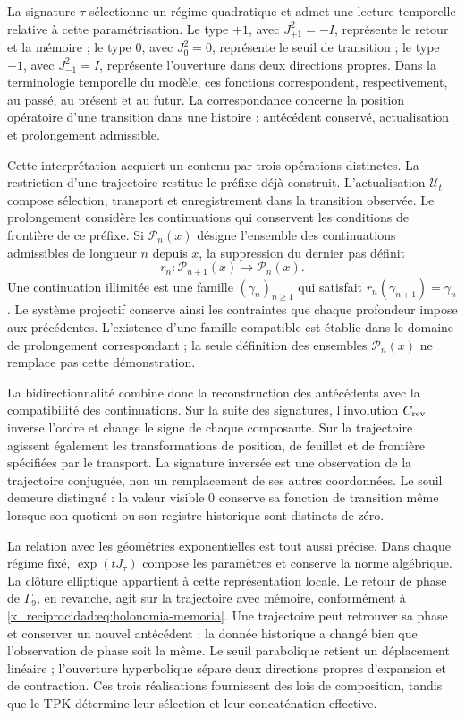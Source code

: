 La signature \(\tau\) sélectionne un régime quadratique et admet une lecture
temporelle relative à cette paramétrisation. Le type \(+1\), avec
\(J_{+1}^{2}=-I\), représente le retour et la mémoire ; le type \(0\), avec
\(J_0^{2}=0\), représente le seuil de transition ; le type \(-1\), avec
\(J_{-1}^{2}=I\), représente l’ouverture dans deux directions propres. Dans la
terminologie temporelle du modèle, ces fonctions correspondent,
respectivement, au passé, au présent et au futur. La correspondance concerne
la position opératoire d’une transition dans une histoire :
antécédent conservé, actualisation et prolongement admissible.

Cette interprétation acquiert un contenu par trois opérations distinctes.
La restriction d’une trajectoire restitue le préfixe déjà construit.
L’actualisation \(\mathcal U_t\) compose sélection, transport et enregistrement dans
la transition observée. Le prolongement considère les continuations qui
conservent les conditions de frontière de ce préfixe. Si
\(\mathcal P_n(x)\) désigne l’ensemble des continuations admissibles de
longueur \(n\) depuis \(x\), la suppression du dernier pas définit
\[
 r_n:\mathcal P_{n+1}(x)\longrightarrow\mathcal P_n(x).
\]
Une continuation illimitée est une famille \((\gamma_n)_{n\geq1}\) qui
satisfait \(r_n(\gamma_{n+1})=\gamma_n\). Le système projectif conserve ainsi
les contraintes que chaque profondeur impose aux
précédentes. L’existence d’une famille compatible est établie dans le
domaine de prolongement correspondant ; la seule définition des
ensembles \(\mathcal P_n(x)\) ne remplace pas cette démonstration.

La bidirectionnalité combine donc la reconstruction des antécédents
avec la compatibilité des continuations. Sur la suite des signatures,
l’involution \(C_{\rm rev}\) inverse l’ordre et change le signe de chaque
composante. Sur la trajectoire agissent également les transformations de
position, de feuillet et de frontière spécifiées par le transport. La signature
inversée est une observation de la trajectoire conjuguée, non un remplacement
de ses autres coordonnées. Le seuil demeure distingué : la valeur
visible \(0\) conserve sa fonction de transition même lorsque son quotient
ou son registre historique sont distincts de zéro.

La relation avec les géométries exponentielles est tout aussi précise. Dans
chaque régime fixé, \(\exp(tJ_\tau)\) compose les paramètres et conserve la
norme algébrique. La clôture elliptique appartient à cette représentation locale.
Le retour de phase de \(\Gamma_9\), en revanche, agit sur la trajectoire
avec mémoire, conformément à \eqref{x_reciprocidad:eq:holonomia-memoria}. Une trajectoire peut
retrouver sa phase et conserver un nouvel antécédent : la donnée historique a
changé bien que l’observation de phase soit la même. Le seuil parabolique
retient un déplacement linéaire ; l’ouverture hyperbolique sépare deux
directions propres d’expansion et de contraction. Ces trois réalisations
fournissent des lois de composition, tandis que le TPK détermine leur
sélection et leur concaténation effective.

